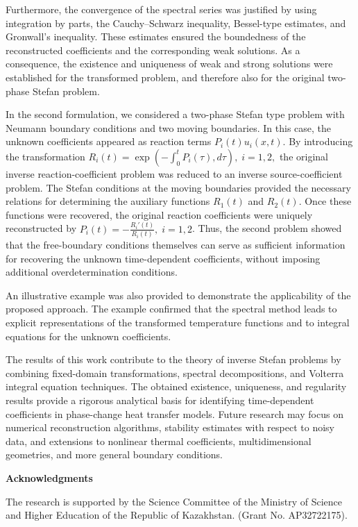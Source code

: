\documentclass[preprint,12pt,authoryear]{elsarticle}
\begin{document}
Furthermore, the convergence of the spectral series was justified by using integration by parts, the Cauchy--Schwarz inequality, Bessel-type estimates, and Gronwall's inequality. These estimates ensured the boundedness of the reconstructed coefficients and the corresponding weak solutions. As a consequence, the existence and uniqueness of weak and strong solutions were established for the transformed problem, and therefore also for the original two-phase Stefan problem.

In the second formulation, we considered a two-phase Stefan type problem with Neumann boundary conditions and two moving boundaries. In this case, the unknown coefficients appeared as reaction terms $P_i(t)u_i(x,t)$. By introducing the transformation $R_i(t)=\exp\left(-\int_0^t P_i(\tau),d\tau\right),\; i=1,2,$ the original inverse reaction-coefficient problem was reduced to an inverse source-coefficient problem. The Stefan conditions at the moving boundaries provided the necessary relations for determining the auxiliary functions $R_1(t)$ and $R_2(t)$. Once these functions were recovered, the original reaction coefficients were uniquely reconstructed by $P_i(t)=-\frac{R_i'(t)}{R_i(t)}, \; i=1,2$. Thus, the second problem showed that the free-boundary conditions themselves can serve as sufficient information for recovering the unknown time-dependent coefficients, without imposing additional overdetermination conditions.

An illustrative example was also provided to demonstrate the applicability of the proposed approach. The example confirmed that the spectral method leads to explicit representations of the transformed temperature functions and to integral equations for the unknown coefficients.

The results of this work contribute to the theory of inverse Stefan problems by combining fixed-domain transformations, spectral decompositions, and Volterra integral equation techniques. The obtained existence, uniqueness, and regularity results provide a rigorous analytical basis for identifying time-dependent coefficients in phase-change heat transfer models. Future research may focus on numerical reconstruction algorithms, stability estimates with respect to noisy data, and extensions to nonlinear thermal coefficients, multidimensional geometries, and more general boundary conditions.


\textbf{Acknowledgments}

The research is supported by the Science Committee of the Ministry of Science and Higher Education of the Republic of Kazakhstan. (Grant No. AP32722175).
 
\end{document}
